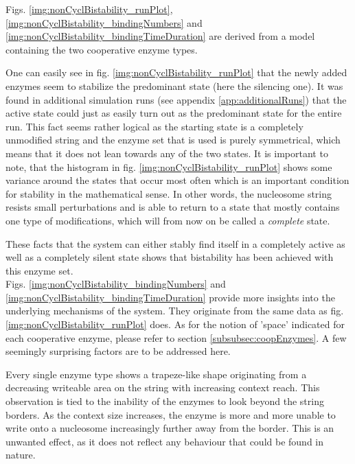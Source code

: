             Figs. \ref{img:nonCyclBistability_runPlot}, \ref{img:nonCyclBistability_bindingNumbers} and \ref{img:nonCyclBistability_bindingTimeDuration} are derived from a model containing the two cooperative enzyme types.

            One can easily see in fig. \ref{img:nonCyclBistability_runPlot} that the newly added enzymes seem to stabilize the predominant state (here the silencing one). It was found in additional simulation runs (see appendix \ref{app:additionalRuns}) that the active state could just as easily turn out as the predominant state for the entire run. This fact seems rather logical as the starting state is a completely unmodified string and the enzyme set that is used is purely symmetrical, which means that it does not lean towards any of the two states. It is important to note, that the histogram in fig. \ref{img:nonCyclBistability_runPlot} shows some variance around the states that occur most often which is an important condition for stability in the mathematical sense. In other words, the nucleosome string resists small perturbations and is able to return to a state that mostly contains one type of modifications, which will from now on be called a \textit{complete} state.

            These facts that the system can either stably find itself in a completely active as well as a completely silent state shows that bistability has been achieved with this enzyme set.\\

            Figs. \ref{img:nonCyclBistability_bindingNumbers} and \ref{img:nonCyclBistability_bindingTimeDuration} provide more insights into the underlying mechanisms of the system. They originate from the same data as fig. \ref{img:nonCyclBistability_runPlot} does. As for the notion of 'space' indicated for each cooperative enzyme, please refer to section \ref{subsubsec:coopEnzymes}. A few seemingly surprising factors are to be addressed here.

            Every single enzyme type shows a trapeze-like shape originating from a decreasing writeable area on the string with increasing context reach. This observation is tied to the inability of the enzymes to look beyond the string borders. As the context size increases, the enzyme is more and more unable to write onto a nucleosome  increasingly further away from the border. This is an unwanted effect, as it does not reflect any behaviour that could be found in nature.

